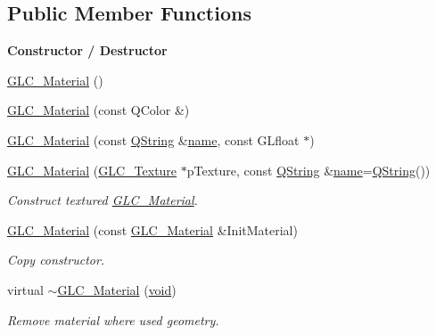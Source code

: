 \subsection*{Public Member Functions}
\begin{Indent}{\bf Constructor / Destructor}\par
\begin{DoxyCompactItemize}
\item 
\hyperlink{class_g_l_c___material_a8e0f1a74114f411dfcf4af5555c151b1}{G\-L\-C\-\_\-\-Material} ()
\item 
\hyperlink{class_g_l_c___material_aedd777ed5057e8e9b75f55a30778387c}{G\-L\-C\-\_\-\-Material} (const Q\-Color \&)
\item 
\hyperlink{class_g_l_c___material_a379f6244d2d3cc964e6cf85e19e4a18f}{G\-L\-C\-\_\-\-Material} (const \hyperlink{group___u_a_v_objects_plugin_gab9d252f49c333c94a72f97ce3105a32d}{Q\-String} \&\hyperlink{glext_8h_ad977737dfc9a274a62741b9500c49a32}{name}, const G\-Lfloat $\ast$)
\item 
\hyperlink{class_g_l_c___material_af581997b9f63ad70e8aaf967aa266018}{G\-L\-C\-\_\-\-Material} (\hyperlink{class_g_l_c___texture}{G\-L\-C\-\_\-\-Texture} $\ast$p\-Texture, const \hyperlink{group___u_a_v_objects_plugin_gab9d252f49c333c94a72f97ce3105a32d}{Q\-String} \&\hyperlink{glext_8h_ad977737dfc9a274a62741b9500c49a32}{name}=\hyperlink{group___u_a_v_objects_plugin_gab9d252f49c333c94a72f97ce3105a32d}{Q\-String}())
\begin{DoxyCompactList}\small\item\em Construct textured \hyperlink{class_g_l_c___material}{G\-L\-C\-\_\-\-Material}. \end{DoxyCompactList}\item 
\hyperlink{class_g_l_c___material_a50f010447bb35c08858d7218050b8a47}{G\-L\-C\-\_\-\-Material} (const \hyperlink{class_g_l_c___material}{G\-L\-C\-\_\-\-Material} \&Init\-Material)
\begin{DoxyCompactList}\small\item\em Copy constructor. \end{DoxyCompactList}\item 
virtual \hyperlink{class_g_l_c___material_ab16c3bf5d4325ddbebe2e65ad50ae62b}{$\sim$\-G\-L\-C\-\_\-\-Material} (\hyperlink{group___u_a_v_objects_plugin_ga444cf2ff3f0ecbe028adce838d373f5c}{void})
\begin{DoxyCompactList}\small\item\em Remove material where used geometry. \end{DoxyCompactList}\end{DoxyCompactItemize}
\end{Indent}
